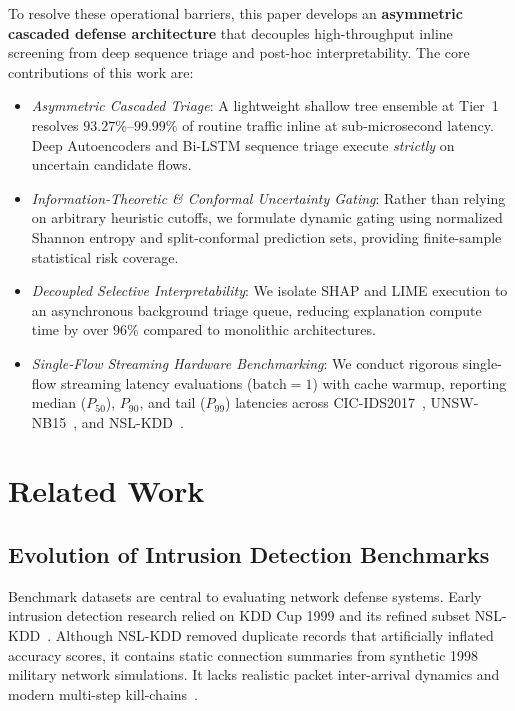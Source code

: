 \documentclass[conference]{IEEEtran}
\begin{document}
To resolve these operational barriers, this paper develops an \textbf{asymmetric cascaded defense architecture} that decouples high-throughput inline screening from deep sequence triage and post-hoc interpretability. The core contributions of this work are:
\begin{itemize}
    \item \textit{Asymmetric Cascaded Triage}: A lightweight shallow tree ensemble at Tier~1 resolves $93.27\%\text{--}99.99\%$ of routine traffic inline at sub-microsecond latency. Deep Autoencoders and Bi-LSTM sequence triage execute \textit{strictly} on uncertain candidate flows.
    \item \textit{Information-Theoretic \& Conformal Uncertainty Gating}: Rather than relying on arbitrary heuristic cutoffs, we formulate dynamic gating using normalized Shannon entropy and split-conformal prediction sets, providing finite-sample statistical risk coverage.
    \item \textit{Decoupled Selective Interpretability}: We isolate SHAP and LIME execution to an asynchronous background triage queue, reducing explanation compute time by over $96\%$ compared to monolithic architectures.
    \item \textit{Single-Flow Streaming Hardware Benchmarking}: We conduct rigorous single-flow streaming latency evaluations ($\text{batch}=1$) with cache warmup, reporting median ($P_{50}$), $P_{90}$, and tail ($P_{99}$) latencies across CIC-IDS2017~\cite{sharafaldin2018cicids}, UNSW-NB15~\cite{moustafa2015unsw}, and NSL-KDD~\cite{tavallaee2009detailed}.
\end{itemize}

\section{Related Work}

\subsection{Evolution of Intrusion Detection Benchmarks}
Benchmark datasets are central to evaluating network defense systems. Early intrusion detection research relied on KDD Cup 1999 and its refined subset NSL-KDD~\cite{tavallaee2009detailed}. Although NSL-KDD removed duplicate records that artificially inflated accuracy scores, it contains static connection summaries from synthetic 1998 military network simulations. It lacks realistic packet inter-arrival dynamics and modern multi-step kill-chains~\cite{ring2019survey}.
\end{document}
